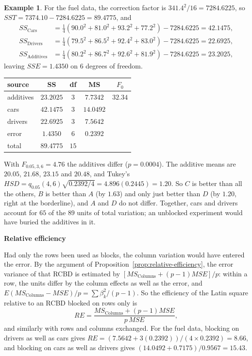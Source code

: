 \documentclass[11pt,a4paper]{article}
\numberwithin{equation}{section}
\theoremstyle{definition}
\newtheorem{exa}[thm]{Example}
\newcommand{\subhead}[1]{%
  \par\medskip\noindent\textbf{#1}\par\nobreak\smallskip}
\begin{document}
\begin{exa}\label{exa:fuel-anova}
For the fuel data, the correction factor is $341.4^2/16 = 7284.6225$, so $SST = 7374.10 - 7284.6225 = 89.4775$, and
\begin{align*}
SS_{\mathrm{Cars}} &= \tfrac14(90.0^2 + 81.0^2 + 93.2^2 + 77.2^2) - 7284.6225 = 42.1475 , \\
SS_{\mathrm{Drivers}} &= \tfrac14(79.5^2 + 86.5^2 + 92.4^2 + 83.0^2) - 7284.6225 = 22.6925 , \\
SS_{\mathrm{Additives}} &= \tfrac14(80.2^2 + 86.7^2 + 92.6^2 + 81.9^2) - 7284.6225 = 23.2025 ,
\end{align*}
leaving $SSE = 1.4350$ on $6$ degrees of freedom.
\begin{center}
\begin{tabular}{l|c|c|c|c}
source & SS & df & MS & $F_0$ \\
\hline
additives & $23.2025$ & $3$ & $7.7342$ & $32.34$ \\
cars & $42.1475$ & $3$ & $14.0492$ & \\
drivers & $22.6925$ & $3$ & $7.5642$ & \\
error & $1.4350$ & $6$ & $0.2392$ & \\
\hline
total & $89.4775$ & $15$ & &
\end{tabular}
\end{center}
With $F_{0.05,3,6} = 4.76$ the additives differ ($p = 0.0004$). The additive means are $20.05$, $21.68$, $23.15$ and $20.48$, and Tukey's
$HSD = q_{0.05}(4, 6)\sqrt{0.2392/4} = 4.896(0.2445) = 1.20$. So $C$ is better than all the others, $B$ is better than $A$ (by $1.63$) and only just better than $D$ (by
$1.20$, right at the borderline), and $A$ and $D$ do not differ. Together, cars and drivers account for $65$ of the $89$ units of total variation; an
unblocked experiment would have buried the additives in it.
\end{exa}

\subhead{Relative efficiency}
Had only the rows been used as blocks, the column variation would have entered the error. By the argument of
Proposition~\ref{prop:relative-efficiency}, the error variance of that RCBD is estimated by $[MS_{\mathrm{Columns}} + (p - 1)MSE]/p$: within a row, the units differ by the
column effects as well as the error, and $E(MS_{\mathrm{Columns}} - MSE)/p = \sum\beta_k^2/(p - 1)$. So the efficiency of the Latin square relative to an RCBD blocked on rows
only is
\[
RE = \frac{MS_{\mathrm{Columns}} + (p - 1)MSE}{p\,MSE} ,
\]
and similarly with rows and columns exchanged. For the fuel data, blocking on drivers as well as cars gives
$RE = (7.5642 + 3(0.2392))/(4 \times 0.2392) = 8.66$, and blocking on cars as well as drivers gives $(14.0492 + 0.7175)/0.9567 = 15.43$.
\end{document}

